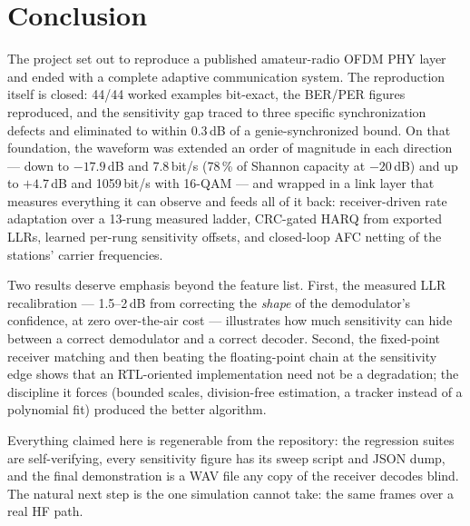 \section{Conclusion}
\label{sec:conclusion}

The project set out to reproduce a published amateur-radio OFDM PHY
layer and ended with a complete adaptive communication system.  The
reproduction itself is closed: 44/44 worked examples bit-exact, the
BER/PER figures reproduced, and the sensitivity gap traced to three
specific synchronization defects and eliminated to within 0.3\,dB of a
genie-synchronized bound.  On that foundation, the waveform was
extended an order of magnitude in each direction --- down to
$-17.9$\,dB and 7.8\,bit/s (78\,\% of Shannon capacity at $-20$\,dB)
and up to $+4.7$\,dB and 1059\,bit/s with 16-QAM --- and wrapped in a
link layer that measures everything it can observe and feeds all of it
back: receiver-driven rate adaptation over a 13-rung measured ladder,
CRC-gated HARQ from exported LLRs, learned per-rung sensitivity
offsets, and closed-loop AFC netting of the stations' carrier
frequencies.

Two results deserve emphasis beyond the feature list.  First, the
measured LLR recalibration --- 1.5--2\,dB from correcting the
\emph{shape} of the demodulator's confidence, at zero over-the-air
cost --- illustrates how much sensitivity can hide between a correct
demodulator and a correct decoder.  Second, the fixed-point receiver
matching and then beating the floating-point chain at the sensitivity
edge shows that an RTL-oriented implementation need not be a
degradation; the discipline it forces (bounded scales, division-free
estimation, a tracker instead of a polynomial fit) produced the better
algorithm.

Everything claimed here is regenerable from the repository: the
regression suites are self-verifying, every sensitivity figure has its
sweep script and JSON dump, and the final demonstration is a WAV file
any copy of the receiver decodes blind.  The natural next step is the
one simulation cannot take: the same frames over a real HF path.
